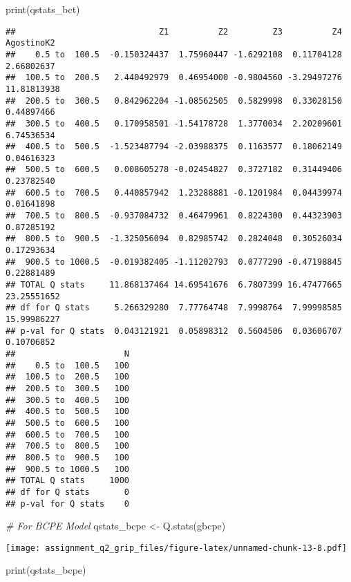 \documentclass[
]{article}
\newenvironment{Shaded}{\begin{snugshade}}{\end{snugshade}}
\newcommand{\CommentTok}[1]{\textcolor[rgb]{0.56,0.35,0.01}{\textit{#1}}}
\newcommand{\FunctionTok}[1]{\textcolor[rgb]{0.00,0.00,0.00}{#1}}
\newcommand{\NormalTok}[1]{#1}
\newcommand{\OtherTok}[1]{\textcolor[rgb]{0.56,0.35,0.01}{#1}}
\begin{document}
\begin{Shaded}
\begin{Highlighting}[]
\FunctionTok{print}\NormalTok{(qstats\_bct)}
\end{Highlighting}
\end{Shaded}

\begin{verbatim}
##                             Z1          Z2         Z3          Z4  AgostinoK2
##    0.5 to  100.5  -0.150324437  1.75960447 -1.6292108  0.11704128  2.66802637
##  100.5 to  200.5   2.440492979  0.46954000 -0.9804560 -3.29497276 11.81813938
##  200.5 to  300.5   0.842962204 -1.08562505  0.5829998  0.33028150  0.44897466
##  300.5 to  400.5   0.170958501 -1.54178728  1.3770034  2.20209601  6.74536534
##  400.5 to  500.5  -1.523487794 -2.03988375  0.1163577  0.18062149  0.04616323
##  500.5 to  600.5   0.008605278 -0.02454827  0.3727182  0.31449406  0.23782540
##  600.5 to  700.5   0.440857942  1.23288881 -0.1201984  0.04439974  0.01641898
##  700.5 to  800.5  -0.937084732  0.46479961  0.8224300  0.44323903  0.87285192
##  800.5 to  900.5  -1.325056094  0.82985742  0.2824048  0.30526034  0.17293634
##  900.5 to 1000.5  -0.019382405 -1.11202793  0.0777290 -0.47198845  0.22881489
## TOTAL Q stats     11.868137464 14.69541676  6.7807399 16.47477665 23.25551652
## df for Q stats     5.266329280  7.77764748  7.9998764  7.99998585 15.99986227
## p-val for Q stats  0.043121921  0.05898312  0.5604506  0.03606707  0.10706852
##                      N
##    0.5 to  100.5   100
##  100.5 to  200.5   100
##  200.5 to  300.5   100
##  300.5 to  400.5   100
##  400.5 to  500.5   100
##  500.5 to  600.5   100
##  600.5 to  700.5   100
##  700.5 to  800.5   100
##  800.5 to  900.5   100
##  900.5 to 1000.5   100
## TOTAL Q stats     1000
## df for Q stats       0
## p-val for Q stats    0
\end{verbatim}

\begin{Shaded}
\begin{Highlighting}[]
\CommentTok{\# For BCPE Model}
\NormalTok{qstats\_bcpe }\OtherTok{\textless{}{-}} \FunctionTok{Q.stats}\NormalTok{(gbcpe)}
\end{Highlighting}
\end{Shaded}

\texttt{[image: assignment\_q2\_grip\_files/figure-latex/unnamed-chunk-13-8.pdf]}

\begin{Shaded}
\begin{Highlighting}[]
\FunctionTok{print}\NormalTok{(qstats\_bcpe)}
\end{Highlighting}
\end{Shaded}
\end{document}

